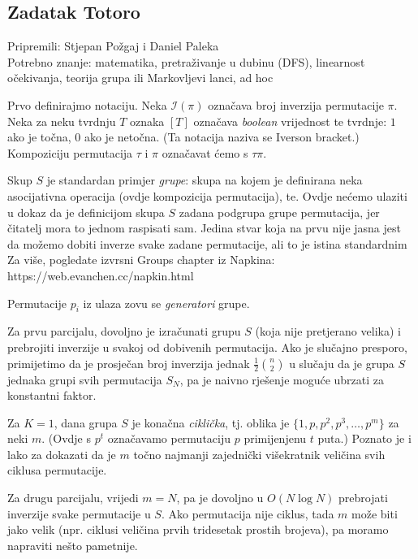 \newcommand\EE{\mathbb E}
\newcommand\PP{\mathbb P}
\newcommand\II{\mathcal I}

\subsection*{Zadatak Totoro}
\textsf{Pripremili: Stjepan Požgaj i Daniel Paleka}\\
\textsf{Potrebno znanje: matematika, pretraživanje u dubinu (DFS), 
linearnost očekivanja, teorija grupa ili Markovljevi lanci, ad hoc }

Prvo definirajmo notaciju.
Neka $\mathcal{I}(\pi)$ označava broj inverzija permutacije $\pi$.
Neka za neku tvrdnju $T$ oznaka $[T]$ označava \textit{boolean} vrijednost
te tvrdnje: $1$ ako je točna, $0$ ako je netočna. (Ta notacija naziva se 
Iverson bracket.) Kompoziciju permutacija $\tau$ i $\pi$ označavat ćemo s
$\tau \pi$.

Skup $S$ je standardan primjer \textit{grupe}: skupa na kojem je definirana
neka asocijativna operacija (ovdje kompozicija permutacija), te.
Ovdje nećemo ulaziti u dokaz da je definicijom skupa $S$ zadana podgrupa
grupe permutacija, jer čitatelj mora to jednom raspisati sam.
Jedina stvar koja na prvu nije jasna jest da možemo dobiti inverze
svake zadane permutacije, ali to je istina standardnim 
Za više, pogledate izvrsni Groups chapter iz Napkina:
{https://web.evanchen.cc/napkin.html}

Permutacije $p_i$ iz ulaza zovu se \textit{generatori} grupe.

Za prvu parcijalu, dovoljno je izračunati grupu $S$ (koja nije 
pretjerano velika) i prebrojiti inverzije u svakoj
od dobivenih permutacija. Ako je slučajno presporo, 
primijetimo da je prosječan broj inverzija
jednak $\frac{1}{2} \binom{n}{2}$
u slučaju da je grupa $S$ jednaka grupi svih permutacija $S_N$,
pa je naivno rješenje moguće ubrzati za konstantni faktor.

Za $K = 1$, dana grupa $S$ je konačna \textit{ciklička}, 
tj. oblika je $\{ 1, p, p^2, p^3, \ldots, p^m \}$ za neki $m$.
(Ovdje s $p^t$ označavamo permutaciju $p$ primijenjenu $t$ puta.)
Poznato je i lako za dokazati da je $m$ točno najmanji
zajednički višekratnik veličina svih ciklusa permutacije.

Za drugu parcijalu, vrijedi $m = N$, pa je dovoljno u $O(N \log N)$
prebrojati inverzije svake permutacije u $S$. 
Ako permutacija nije ciklus, tada $m$ može biti jako velik
(npr. ciklusi veličina prvih tridesetak prostih brojeva), 
pa moramo napraviti nešto pametnije.

